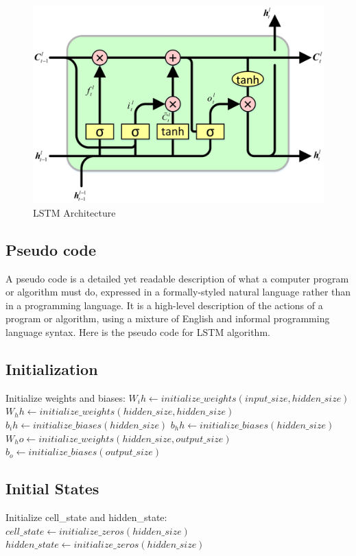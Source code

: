 \documentclass[./main.tex]{subfiles}
\begin{document}
\begin{figure}[H]
    \centering
    \includegraphics[width=0.75\linewidth]{images/LSTM.png}
    \caption{LSTM Architecture}
    \label{fig:4.5}
\end{figure}


\subsection*{Pseudo code}
\noindent
A pseudo code is a detailed yet readable description of what a computer program or algorithm must do, expressed in a formally-styled natural language rather than in a programming language. It is a high-level description of the actions of a program or algorithm, using a mixture of English and informal programming language syntax. Here is the pseudo code for LSTM algorithm.
\subsection*{Initialization}

\begin{algorithmic}
  \State Initialize weights and biases:
  \State $W_ih \gets initialize\_weights(input\_size, hidden\_size)$
  \State $W_hh \gets initialize\_weights(hidden\_size, hidden\_size)$
  \State $b_ih \gets initialize\_biases(hidden\_size)$
  \State $b_hh \gets initialize\_biases(hidden\_size)$
  \State $W_ho \gets initialize\_weights(hidden\_size, output\_size)$
  \State $b_o \gets initialize\_biases(output\_size)$
\end{algorithmic}

\subsection*{Initial States}
\begin{algorithmic}
  \State Initialize cell\_state and hidden\_state:
  \State $cell\_state \gets initialize\_zeros(hidden\_size)$
  \State $hidden\_state \gets initialize\_zeros(hidden\_size)$
\end{algorithmic}
\end{document}
